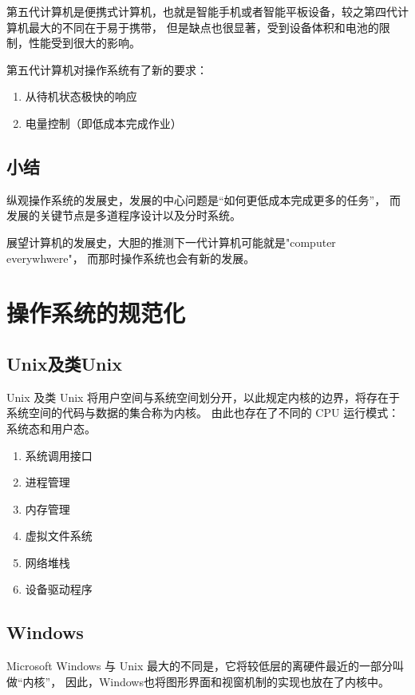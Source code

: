 第五代计算机是便携式计算机，也就是智能手机或者智能平板设备，较之第四代计算机最大的不同在于易于携带，
但是缺点也很显著，受到设备体积和电池的限制，性能受到很大的影响。

第五代计算机对操作系统有了新的要求：
\begin{enumerate}
  \item 从待机状态极快的响应
  \item 电量控制（即低成本完成作业）
\end{enumerate}


\subsection{小结}

纵观操作系统的发展史，发展的中心问题是“如何更低成本完成更多的任务”，
而发展的关键节点是多道程序设计以及分时系统。

展望计算机的发展史，大胆的推测下一代计算机可能就是"computer everywhwere"，
而那时操作系统也会有新的发展。

\section{操作系统的规范化}

\subsection{Unix及类Unix}
Unix 及类 Unix 将用户空间与系统空间划分开，以此规定内核的边界，将存在于系统空间的代码与数据的集合称为内核。
由此也存在了不同的 CPU 运行模式：系统态和用户态。
\begin{enumerate}
  \item 系统调用接口
  \item 进程管理
  \item 内存管理
  \item 虚拟文件系统
  \item 网络堆栈
  \item 设备驱动程序
\end{enumerate}

\subsection{Windows}

Microsoft Windows 与 Unix 最大的不同是，它将较低层的离硬件最近的一部分叫做“内核”，
因此，Windows也将图形界面和视窗机制的实现也放在了内核中。

